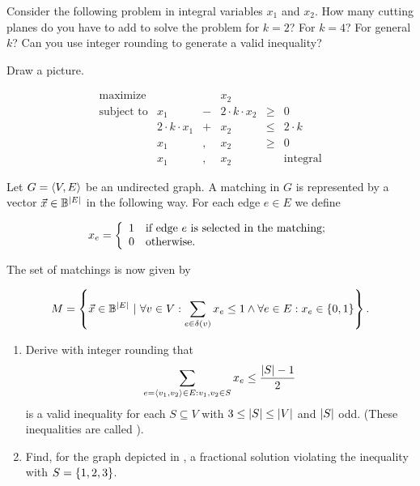 \begin{exercise}
Consider the following problem in integral variables $x_1$ and $x_2$. How many cutting planes do you have to add to solve the problem for $k=2$? For $k=4$? For general $k$? Can you use integer rounding to generate a valid inequality?
\begin{hint}
Draw a picture.
\end{hint}
\begin{equation}
\begin{array}{rrcrcr}
\mbox{maximize}&&&x_2\\
\mbox{subject to}&x_1&-&2\cdot k\cdot x_2&\geq&0\\
&2\cdot k\cdot x_1&+&x_2&\leq&2\cdot k\\
&x_1&,&x_2&\geq&0\\
&x_1&,&x_2&&\mbox{integral}
\end{array}
\end{equation}
\end{exercise}
\begin{exercise}
Let $G=\tupl{V,E}$ be an undirected graph. A matching in $G$ is represented by a vector $\vec{x}\in\BoolSet^{\abs{E}}$ in the following way. For each edge $e\in E$ we define

\begin{equation}
\semboolvar{x_e}{if edge $e$ is selected in the matching;}{otherwise.}
\end{equation}

The set of matchings is now given by

\begin{equation}
M=\condset{\vec{x}\in\BoolSet^{|E|}}{\forall v\in V:\sumdomain[e]{\fun{\delta}{v}}{x_e}\leq 1\wedge\forall e\in E:x_e\in\accl{0,1}}.
\end{equation}

\begin{enumerate}
 \item Derive with integer rounding that
\begin{equation}
\sumdomain[e=\tupl{v_1,v_2}]{E:v_1,v_2\in S}{x_e}\leq\displaystyle\frac{\abs{S}-1}{2}
\eqnlab{matching-introunding}
\end{equation}
is a valid inequality for each $S\subseteq V$ with $3\leq\abs{S}\leq\abs{V}$ and $\abs{S}$ odd. (These inequalities are called ).
 \item Find, for the graph depicted in , a fractional solution violating the inequality  with $S=\accl{1,2,3}$.
\end{enumerate}
\end{exercise}
